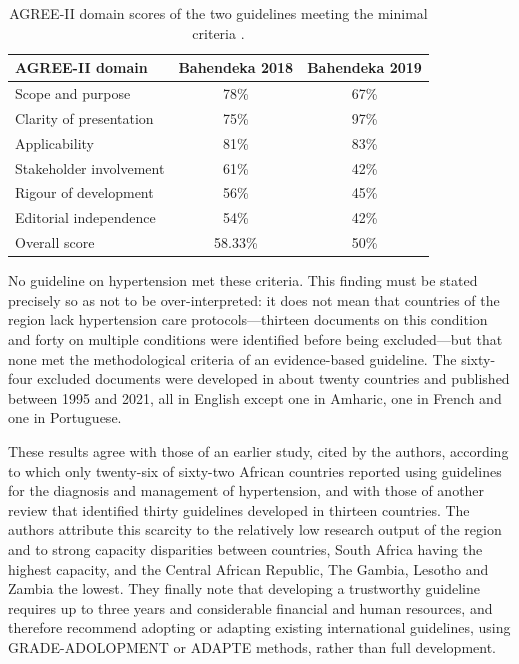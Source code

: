 \documentclass[12pt,a4paper,oneside]{report}
\begin{document}
\begin{table}[htbp]
\centering\small
\caption{AGREE-II domain scores of the two guidelines meeting the minimal criteria \parencite{nagavci2022}.}\label{tab:agree}
\begin{tabular}{@{}lcc@{}}
\toprule
\textbf{AGREE-II domain} & \textbf{Bahendeka 2018} & \textbf{Bahendeka 2019} \\
\midrule
Scope and purpose & 78\% & 67\% \\
Clarity of presentation & 75\% & 97\% \\
Applicability & 81\% & 83\% \\
Stakeholder involvement & 61\% & 42\% \\
Rigour of development & 56\% & 45\% \\
Editorial independence & 54\% & 42\% \\
\midrule
Overall score & 58.33\% & 50\% \\
\bottomrule
\end{tabular}
\end{table}

No guideline on hypertension met these criteria. This finding must be stated precisely so as not to be over-interpreted: it does not mean that countries of the region lack hypertension care protocols---thirteen documents on this condition and forty on multiple conditions were identified before being excluded---but that none met the methodological criteria of an evidence-based guideline. The sixty-four excluded documents were developed in about twenty countries and published between 1995 and 2021, all in English except one in Amharic, one in French and one in Portuguese.

These results agree with those of an earlier study, cited by the authors, according to which only twenty-six of sixty-two African countries reported using guidelines for the diagnosis and management of hypertension, and with those of another review that identified thirty guidelines developed in thirteen countries. The authors attribute this scarcity to the relatively low research output of the region and to strong capacity disparities between countries, South Africa having the highest capacity, and the Central African Republic, The Gambia, Lesotho and Zambia the lowest. They finally note that developing a trustworthy guideline requires up to three years and considerable financial and human resources, and therefore recommend adopting or adapting existing international guidelines, using GRADE-ADOLOPMENT or ADAPTE methods, rather than full development.
\end{document}
